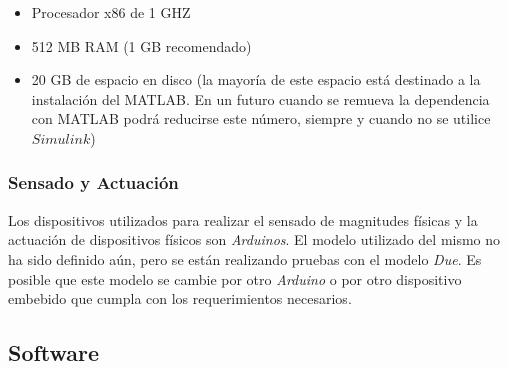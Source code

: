 \documentclass[a4paper,10pt]{article}
\begin{document}
        \begin{itemize}
            \item Procesador x86 de 1 GHZ
            \item 512 MB RAM (1 GB recomendado)
            \item 20 GB de espacio en disco (la mayoría de este espacio está destinado a la instalación del MATLAB. En un futuro cuando
                se remueva la dependencia con MATLAB podrá reducirse este número, siempre y cuando no se utilice $\mathit{Simulink}$)
        \end{itemize}

    \subsubsection{Sensado y Actuación}
        Los dispositivos utilizados para realizar el sensado de magnitudes físicas y la actuación de dispositivos físicos son
        \textit{Arduinos}. El modelo utilizado del mismo no ha sido definido aún, pero se están realizando pruebas con el modelo
        \textit{Due}. Es posible que este modelo se cambie por otro \textit{Arduino} o por otro dispositivo embebido que cumpla con los
        requerimientos necesarios.

    \subsection{Software}
\end{document}

